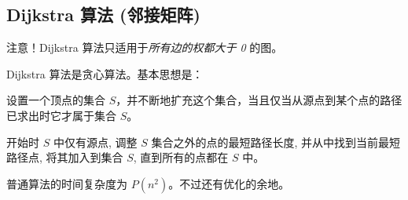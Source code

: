 \subsection{Dijkstra 算法 (邻接矩阵)}
	注意！Dijkstra 算法只适用于\emph{所有边的权都大于 0} 的图。

	Dijkstra 算法是贪心算法。基本思想是：

	设置一个顶点的集合 $S$，并不断地扩充这个集合，当且仅当从源点到某个点的路径已求出时它才属于集合 $S$。

	开始时 $S$ 中仅有源点, 调整 $S$ 集合之外的点的最短路径长度, 并从中找到当前最短路径点, 将其加入到集合 $S$, 直到所有的点都在 $S$ 中。

	普通算法的时间复杂度为 $P(n^{2})$。不过还有优化的余地。
	
	